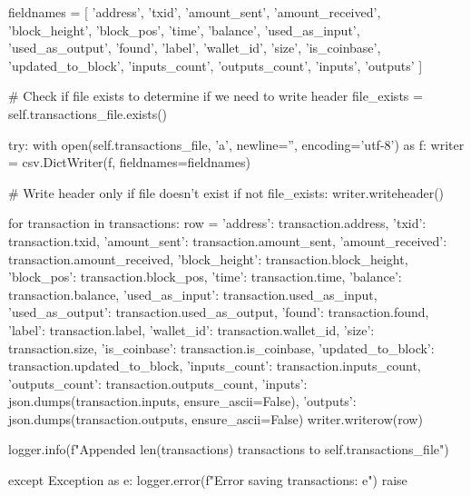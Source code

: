\begin{codelisting}[language=Python, caption=Основной скрипт сбора данных]
        fieldnames = [
            'address', 'txid', 'amount_sent', 'amount_received', 'block_height',
            'block_pos', 'time', 'balance', 'used_as_input', 'used_as_output',
            'found', 'label', 'wallet_id', 'size', 'is_coinbase', 'updated_to_block',
            'inputs_count', 'outputs_count', 'inputs', 'outputs'
        ]
        
        # Check if file exists to determine if we need to write header
        file_exists = self.transactions_file.exists()
        
        try:
            with open(self.transactions_file, 'a', newline='', encoding='utf-8') as f:
                writer = csv.DictWriter(f, fieldnames=fieldnames)
                
                # Write header only if file doesn't exist
                if not file_exists:
                    writer.writeheader()
                
                for transaction in transactions:
                    row = {
                        'address': transaction.address,
                        'txid': transaction.txid,
                        'amount_sent': transaction.amount_sent,
                        'amount_received': transaction.amount_received,
                        'block_height': transaction.block_height,
                        'block_pos': transaction.block_pos,
                        'time': transaction.time,
                        'balance': transaction.balance,
                        'used_as_input': transaction.used_as_input,
                        'used_as_output': transaction.used_as_output,
                        'found': transaction.found,
                        'label': transaction.label,
                        'wallet_id': transaction.wallet_id,
                        'size': transaction.size,
                        'is_coinbase': transaction.is_coinbase,
                        'updated_to_block': transaction.updated_to_block,
                        'inputs_count': transaction.inputs_count,
                        'outputs_count': transaction.outputs_count,
                        'inputs': json.dumps(transaction.inputs, ensure_ascii=False),
                        'outputs': json.dumps(transaction.outputs, ensure_ascii=False)
                    }
                    writer.writerow(row)
            
            logger.info(f"Appended {len(transactions)} transactions to {self.transactions_file}")
            
        except Exception as e:
            logger.error(f"Error saving transactions: {e}")
            raise
    

\end{codelisting}
